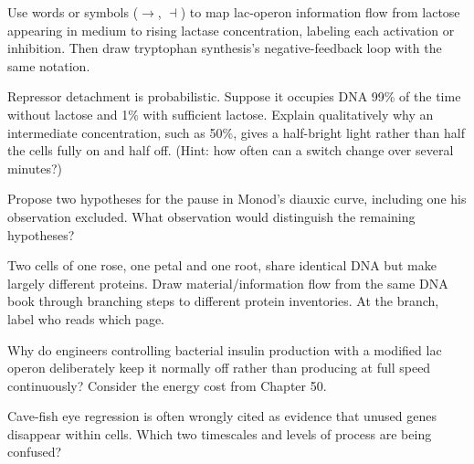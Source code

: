 \begin{sikaoti}
\item Use words or symbols ($\rightarrow$, $\dashv$) to map lac-operon information flow from lactose appearing in medium to rising lactase concentration, labeling each activation or inhibition. Then draw tryptophan synthesis's negative-feedback loop with the same notation.
\item Repressor detachment is probabilistic. Suppose it occupies DNA 99\% of the time without lactose and 1\% with sufficient lactose. Explain qualitatively why an intermediate concentration, such as 50\%, gives a half-bright light rather than half the cells fully on and half off. (Hint: how often can a switch change over several minutes?)
\item Propose two hypotheses for the pause in Monod's diauxic curve, including one his observation excluded. What observation would distinguish the remaining hypotheses?
\item Two cells of one rose, one petal and one root, share identical DNA but make largely different proteins. Draw material/information flow from the same DNA book through branching steps to different protein inventories. At the branch, label who reads which page.
\item Why do engineers controlling bacterial insulin production with a modified lac operon deliberately keep it normally off rather than producing at full speed continuously? Consider the energy cost from Chapter 50.
\item Cave-fish eye regression is often wrongly cited as evidence that unused genes disappear within cells. Which two timescales and levels of process are being confused?
\end{sikaoti}

